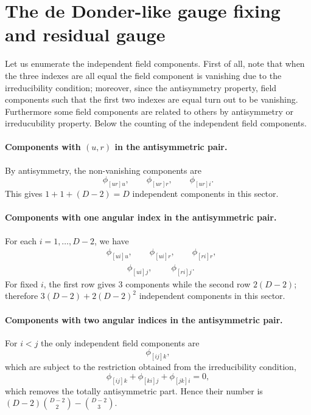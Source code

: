 \documentclass[a4paper,12pt]{article}
\begin{document}
\section{The de Donder-like gauge fixing and residual gauge}\label{sec2}
Let us enumerate the independent field components. First of all, note that when the three indexes are all equal the field component is vanishing due to the irreducibility condition; moreover, since the antisymmetry property, field components such that the first two indexes are equal turn out to be vanishing. Furthermore some field components are related to others by antisymmetry or irreducubility property. Below the counting of the independent field components.

\paragraph{Components with $(u,r)$ in the antisymmetric pair.}

By antisymmetry, the non-vanishing components are
\begin{equation}
\phi_{[ur]u}, \qquad
\phi_{[ur]r}, \qquad
\phi_{[ur]i}.
\end{equation}
This gives
$1+1+(D-2)=D$
independent components in this sector.

\paragraph{Components with one angular index in the antisymmetric pair.}

For each $i=1,\dots ,D-2$, we have
\begin{equation}
\begin{aligned}
&\phi_{[ui]u}, \qquad
\phi_{[ui]r}, \qquad
\phi_{[ri]r}, \\
& \qquad \ \ 
\phi_{[ui]j}, \qquad \  
\phi_{[ri]j}.
\end{aligned}
\end{equation}
For fixed $i$, the first row gives $3$ components while the second row $2(D-2)$;  therefore
$3(D-2)+2(D-2)^2$ independent components in this sector.

\paragraph{Components with two angular indices in the antisymmetric pair.}

For $i<j$ the only independent field components are
\begin{equation}
\phi_{[ij]k},  
\end{equation}
which are subject to the restriction obtained from the irreducibility condition,
\begin{equation}
\phi_{[ij]k}
+\phi_{[ki]j}
+\phi_{[jk]i}
=0 ,
\end{equation}
which removes the totally antisymmetric part. Hence their number is \((D-2)\binom{D-2}{2}-\binom{D-2}{3}.
\)
\end{document}
